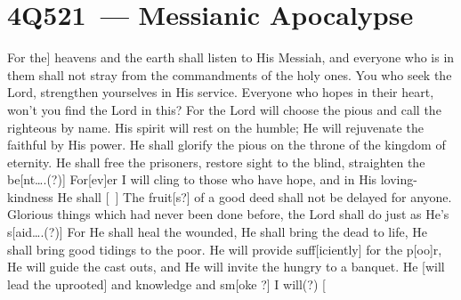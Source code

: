 \section{4Q521~--- Messianic Apocalypse}\label{dss:4q521}

\begin{inparaenum}
     For the] heavens and the earth shall listen to His Messiah,%
     and everyone who is in them shall not stray from the commandments of the holy ones.%
     You who seek the Lord, strengthen yourselves in His service.%
     Everyone who hopes in their heart, won't you find the Lord in this?%
     For the Lord will choose the pious and call the righteous by name.%
     His spirit will rest on the humble; He will rejuvenate the faithful by His power.%
     He shall glorify the pious on the throne of the kingdom of eternity.%
     He shall free the prisoners, restore sight to the blind, straighten the be[nt\dots.(?)]%
     For[ev]er I will cling to those who have hope, and in His loving-kindness He shall [\ ]%
     The fruit[s?] of a good deed shall not be delayed for anyone.%
     Glorious things which had never been done before, the Lord shall do just as He's s[aid\dots.(?)]%
     For He shall heal the wounded, He shall bring the dead to life, He shall bring good tidings to the poor.%
     He will provide suff[iciently] for the p[oo]r, He will guide the cast outs, and He will invite the hungry to a banquet.%
     He [will lead the uprooted] and knowledge and sm[oke ?]%
     I will(?) [%
\end{inparaenum}

